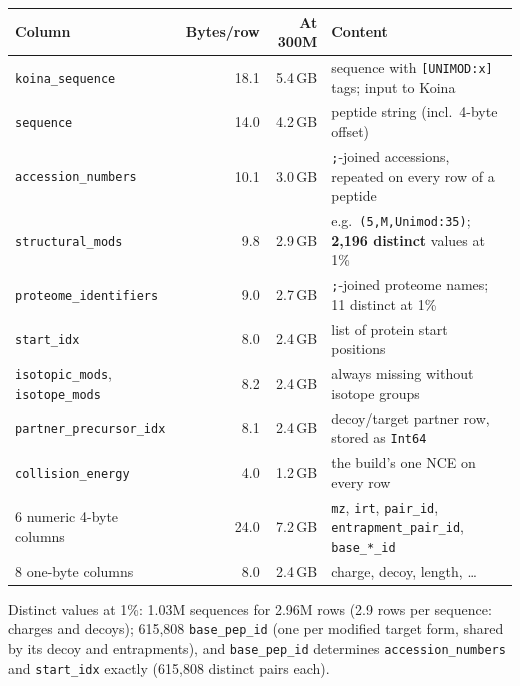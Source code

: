 \documentclass[10pt]{article}
\newcommand{\code}[1]{\texttt{#1}}
\begin{document}
\begin{center}\small
\begin{tabularx}{\linewidth}{l r R l}
\toprule
Column & Bytes/row & At 300M & Content \\
\midrule
\code{koina\_sequence}        & 18.1 & 5.4\,GB & sequence with \code{[UNIMOD:x]} tags; input to Koina \\
\code{sequence}               & 14.0 & 4.2\,GB & peptide string (incl.\ 4-byte offset) \\
\code{accession\_numbers}     & 10.1 & 3.0\,GB & \code{;}-joined accessions, repeated on every row of a peptide \\
\code{structural\_mods}       &  9.8 & 2.9\,GB & e.g.\ \code{(5,M,Unimod:35)}; \textbf{2,196 distinct} values at 1\% \\
\code{proteome\_identifiers}  &  9.0 & 2.7\,GB & \code{;}-joined proteome names; 11 distinct at 1\% \\
\code{start\_idx}             &  8.0 & 2.4\,GB & list of protein start positions \\
\code{isotopic\_mods}, \code{isotope\_mods} & 8.2 & 2.4\,GB & always missing without isotope groups \\
\code{partner\_precursor\_idx} &  8.1 & 2.4\,GB & decoy/target partner row, stored as \code{Int64} \\
\code{collision\_energy}      &  4.0 & 1.2\,GB & the build's one NCE on every row \\
6 numeric 4-byte columns      & 24.0 & 7.2\,GB & \code{mz}, \code{irt}, \code{pair\_id}, \code{entrapment\_pair\_id}, \code{base\_*\_id} \\
8 one-byte columns            &  8.0 & 2.4\,GB & charge, decoy, length, \ldots \\
\bottomrule
\end{tabularx}
\end{center}

Distinct values at 1\%: 1.03M sequences for 2.96M rows (2.9 rows per sequence: charges and decoys);
615,808 \code{base\_pep\_id} (one per modified target form, shared by its decoy and entrapments), and
\code{base\_pep\_id} determines \code{accession\_numbers} and \code{start\_idx} exactly (615,808 distinct pairs each).
\end{document}
